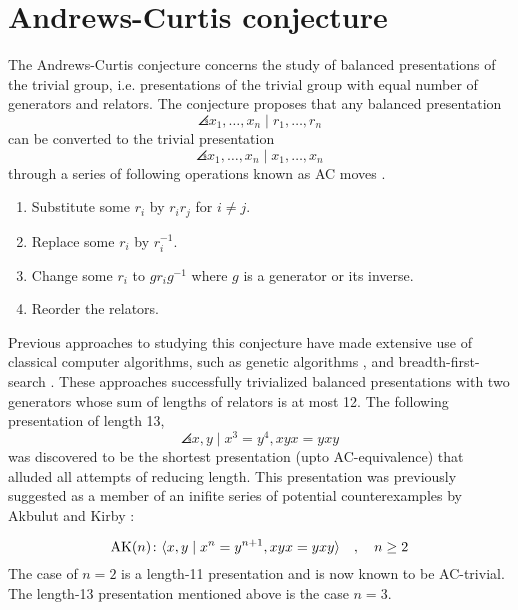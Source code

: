 
\section{Andrews-Curtis conjecture\label{sec:AC}}

The Andrews-Curtis conjecture concerns the study of balanced presentations of the trivial group, i.e. presentations of the trivial group with equal number of generators and relators. The conjecture proposes that any balanced presentation 
\[
\angles{x_1, \dots, x_n \mid r_1, \dots, r_n}
\]
can be converted to the trivial presentation
\[
\angles{x_1, \dots, x_n \mid x_1, \dots, x_n}
\]
through a series of following operations known as AC moves \cite{Andrews-Curtis}.

\begin{enumerate}
	\item Substitute some $r_i$ by $r_i r_j$ for $i \neq j$.
	\item Replace some $r_i$ by $r_i^{-1}$.
	\item Change some $r_i$ to $g r_i g^{-1}$ where $g$ is a generator or its inverse.
	\item Reorder the relators.
\end{enumerate}

Previous approaches to studying this conjecture have made extensive use of classical computer algorithms, such as genetic algorithms \cite{genetic}, and breadth-first-search  \cite{bfs-ac}. These approaches successfully trivialized balanced presentations with two generators whose sum of lengths of relators is at most 12. The following presentation of length 13,
\[
\angles{x, y \mid x^3 = y^4, xyx = yxy}
\]
was discovered to be the shortest presentation (upto AC-equivalence) that alluded all attempts of reducing length. This presentation was previously suggested as a member of an inifite series of potential counterexamples by Akbulut and Kirby \cite{Akbulut-Kirby}:

\[
\text{AK}(n) \colon \langle x, y \mid x^n = y^{n+1}, xyx = yxy\rangle \quad , \quad n \geq 2
\]
The case of $n=2$ is a length-11 presentation and is now known to be AC-trivial. The length-13 presentation mentioned above is the case $n=3$. 
\newline

